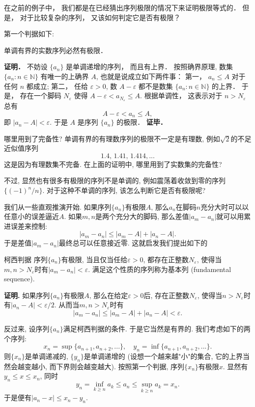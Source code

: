 

在之前的例子中， 我们都是在已经猜出序列极限的情况下来证明极限等式的． 但是， 对于比较复杂的序列， 又该如何判定它是否有极限？

第一个判据如下:

\begin{theorem}{}
单调有界的实数序列必然有极限．
\end{theorem}
\textbf{证明．} 不妨设 $\{a_n\}$ 是单调递增的序列， 而且有上界． 按照确界原理, 数集 $\{a_n:n\in\mathbb{N}\}$ 有唯一的上确界 $A$, 也就是说成立如下两件事： 第一， $a_n\leq A$ 对于任何 $n$ 都成立; 第二， 任给 $\varepsilon>0$, 数 $A-\varepsilon$ 都不是数集 $\{a_n:n\in\mathbb{N}\}$ 的上界． 于是， 存在一个脚码 $N_\varepsilon$ 使得 $A-\varepsilon<a_{N_\varepsilon}\leq A$. 根据单调性， 这表示对于 $n>N_\varepsilon$ 总有
\[A-\varepsilon<a_n\leq A,\]
即 $|a_n-A|<\varepsilon$. 于是 $A$ 是序列 $\{a_n\}$ 的极限． \textbf{证毕．}

\begin{exercise}{哪里用到了完备性?}
单调有界的有理数序列的极限不一定是有理数, 例如$\sqrt{2}$的不足近似值序列
$$
1.4,\,1.41,\,1.414,...
$$
这是因为有理数集不完备. 在上面的证明中, 哪里用到了实数集的完备性?
\end{exercise}

不过, 显然也有很多有极限的序列不是单调的, 例如震荡着收敛到零的序列$\{(-1)^n/n\}$. 对于这种不单调的序列, 该怎么判断它是否有极限呢?

我们从一些直观推演开始. 如果序列$\{a_n\}$有极限$A$, 那么$a_n$在脚码$n$充分大时可以以任意小的误差逼近$A$. 如果$m,n$是两个充分大的脚码, 那么差值$|a_m-a_n|$就可以用累进误差来控制:
$$
|a_m-a_n|\leq |a_m-A|+|a_n-A|.
$$
于是差值$|a_m-a_n|$最终总可以任意接近零. 这就启发我们提出如下的

\begin{theorem}{柯西判据}
序列$\{a_n\}$有极限, 当且仅当任给$\varepsilon>0$, 都存在正整数$N_\varepsilon$, 使得当$m,n>N_\varepsilon$时有$|a_m-a_n|<\varepsilon$. 满足这个性质的序列称为基本列 (fundamental sequence).
\end{theorem}

\textbf{证明.} 如果序列$\{a_n\}$有极限$A$, 那么在给定$\varepsilon>0$后, 存在正整数$N_\varepsilon$, 使得当$n>N_\varepsilon$时有$|a_n-A|<\varepsilon/2$. 从而当$m,n>N_\varepsilon$时有
$$
|a_m-a_n|\leq|a_m-A|+|a_n-A|<\varepsilon.
$$

反过来, 设序列$\{a_n\}$满足柯西判据的条件. 于是它当然是有界的. 我们考虑如下的两个序列:
$$
x_n=\sup\{a_{n+1},a_{n+2},...\},
\quad
y_n=\inf\{a_{n+1},a_{n+2},...\}.
$$
则$\{x_n\}$是单调递减的, $\{y_n\}$是单调递增的 (设想一个越来越"小"的集合, 它的上界当然会越变越小, 而下界则会越变越大). 按照第一个判据, 序列$\{x_n\}$有极限$x$. 显然有$y_n\leq x\leq x_n$, 同时
$$
y_n=\inf_{k\geq n}a_k\leq a_n\leq \sup_{k\geq n}a_k=x_n.
$$
于是便有$|a_n-x|\leq x_n-y_n$. 


